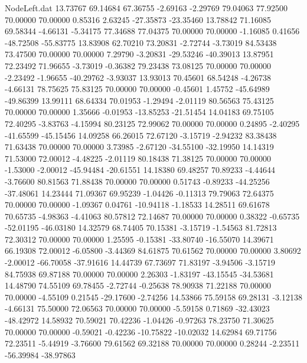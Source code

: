 \begin{filecontents}{NodeLeft.dat}
  13.73767   69.14684   67.36755    -2.69163   -2.29769   79.04063   77.92500   70.00000   70.00000    0.85316    2.63245  -27.35873  -23.35460
  13.78842   71.16085   69.58344    -4.66131   -5.34175   77.34688   77.04375   70.00000   70.00000   -1.16085    0.41656  -48.72508  -55.83775
  13.83908   62.70210   73.20831    -2.72744   -3.73019   84.53438   73.47500   70.00000   70.00000    7.29790   -3.20831  -29.53246  -40.39013
  13.87951   72.23492   71.96655    -3.73019   -0.36382   79.23438   73.08125   70.00000   70.00000   -2.23492   -1.96655  -40.29762   -3.93037
  13.93013   70.45601   68.54248    -4.26738   -4.66131   78.75625   75.83125   70.00000   70.00000   -0.45601    1.45752  -45.64989  -49.86399
  13.99111   68.64334   70.01953    -1.29494   -2.01119   80.56563   75.43125   70.00000   70.00000    1.35666   -0.01953  -13.85253  -21.51454
  14.04183   69.75105   72.40295    -3.83763   -4.15994   80.23125   72.99062   70.00000   70.00000    0.24895   -2.40295  -41.65599  -45.15456
  14.09258   66.26015   72.67120    -3.15719   -2.94232   83.38438   71.63438   70.00000   70.00000    3.73985   -2.67120  -34.55100  -32.19950
  14.14319   71.53000   72.00012    -4.48225   -2.01119   80.18438   71.38125   70.00000   70.00000   -1.53000   -2.00012  -45.94484  -20.61551
  14.18380   69.48257   70.89233    -4.44644   -3.76600   80.81563   71.88438   70.00000   70.00000    0.51743   -0.89233  -44.25256  -37.48061
  14.23444   71.09367   69.95239    -1.04426   -0.11313   79.79063   72.64375   70.00000   70.00000   -1.09367    0.04761  -10.94118   -1.18533
  14.28511   69.61678   70.65735    -4.98363   -4.41063   80.57812   72.14687   70.00000   70.00000    0.38322   -0.65735  -52.01195  -46.03180
  14.32579   68.74405   70.15381    -3.15719   -1.54563   81.72813   72.30312   70.00000   70.00000    1.25595   -0.15381  -33.80740  -16.55070
  14.39671   66.19308   72.00012    -6.05800   -3.44369   84.61875   70.61562   70.00000   70.00000    3.80692   -2.00012  -66.70058  -37.91616
  14.44739   67.73697   71.83197    -3.94506   -3.15719   84.75938   69.87188   70.00000   70.00000    2.26303   -1.83197  -43.15545  -34.53681
  14.48790   74.55109   69.78455    -2.72744   -0.25638   78.90938   71.22188   70.00000   70.00000   -4.55109    0.21545  -29.17600   -2.74256
  14.53866   75.59158   69.28131    -3.12138   -4.66131   75.50000   72.06563   70.00000   70.00000   -5.59158    0.71869  -32.43023  -48.42972
  14.58932   70.59021   70.42236    -1.04426   -0.97263   78.23750   71.30625   70.00000   70.00000   -0.59021   -0.42236  -10.75822  -10.02032
  14.62984   69.71756   72.23511    -5.44919   -3.76600   79.61562   69.32188   70.00000   70.00000    0.28244   -2.23511  -56.39984  -38.97863

\end{filecontents}
